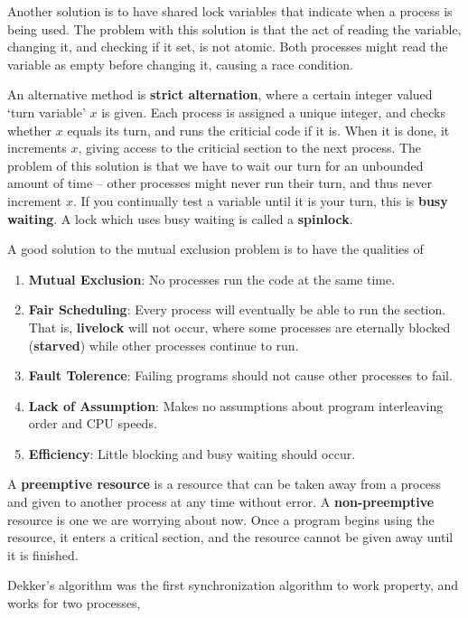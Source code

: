Another solution is to have shared lock variables that indicate when a process is being used. The problem with this solution is that the act of reading the variable, changing it, and checking if it set, is not atomic. Both processes might read the variable as empty before changing it, causing a race condition.

An alternative method is {\bf strict alternation}, where a certain integer valued `turn variable' $x$ is given. Each process is assigned a unique integer, and checks whether $x$ equals its turn, and runs the criticial code if it is. When it is done, it increments $x$, giving access to the criticial section to the next process. The problem of this solution is that we have to wait our turn for an unbounded amount of time -- other processes might never run their turn, and thus never increment $x$. If you continually test a variable until it is your turn, this is {\bf busy waiting}. A lock which uses busy waiting is called a {\bf spinlock}.

A good solution to the mutual exclusion problem is to have the qualities of
%
\begin{enumerate}
    \item {\bf Mutual Exclusion}: No processes run the code at the same time.
    \item {\bf Fair Scheduling}: Every process will eventually be able to run the section. That is, {\bf livelock} will not occur, where some processes are eternally blocked ({\bf starved}) while other processes continue to run.
    \item {\bf Fault Tolerence}: Failing programs should not cause other processes to fail.
    \item {\bf Lack of Assumption}: Makes no assumptions about program interleaving order and CPU speeds.
    \item {\bf Efficiency}: Little blocking and busy waiting should occur.
\end{enumerate}

A {\bf preemptive resource} is a resource that can be taken away from a process and given to another process at any time without error. A {\bf non-preemptive} resource is one we are worrying about now. Once a program begins using the resource, it enters a critical section, and the resource cannot be given away until it is finished.

Dekker's algorithm was the first synchronization algorithm to work property, and works for two processes,

